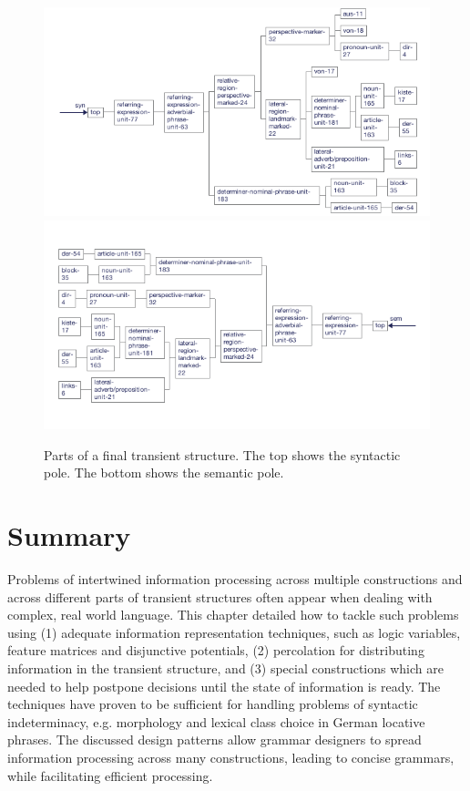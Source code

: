 \begin{figure}
\begin{centering}
\includegraphics[width=\columnwidth]{figs/parse-result-transient-syn}
\includegraphics[width=\columnwidth]{figs/parse-result-transient-sem}
\caption[Final transient structure]{Parts of a final transient structure. The top shows the syntactic pole. The bottom
shows the semantic pole.}
\end{centering}
\label{f:parse-result-transient}
\end{figure}
\section{Summary}
Problems of intertwined information processing across multiple constructions 
and across different parts of transient structures often appear when dealing 
with complex, real world language. This chapter detailed how to tackle such 
problems using (1) adequate information representation techniques, such 
as logic variables, feature matrices and disjunctive potentials,
(2) percolation for distributing information in the transient structure, and 
(3) special constructions which are needed to help postpone decisions until 
the state of information is ready. The techniques have proven to be 
sufficient for handling problems of syntactic indeterminacy, e.g.
morphology and lexical class choice in German locative phrases. 
The discussed design patterns allow grammar 
designers to spread information processing across many constructions, 
leading to concise grammars, while facilitating efficient processing. 

